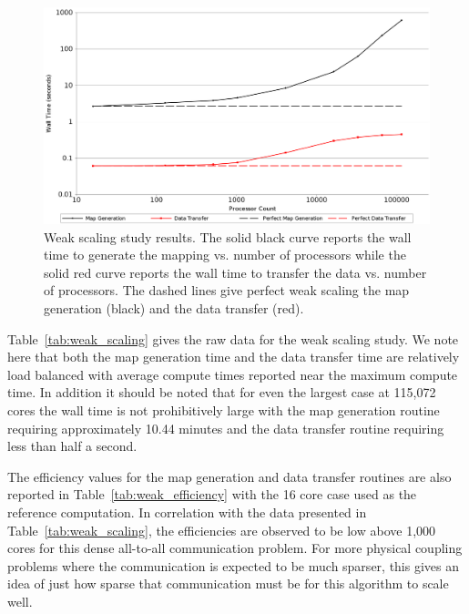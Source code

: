 \documentclass{mc2013}
\begin{document}
\begin{figure}[ht!]
  \centering \includegraphics[width=5.5in]{WeakScaling.png}
  \caption{Weak scaling study results. The solid black curve reports
    the wall time to generate the mapping vs. number of processors
    while the solid red curve reports the wall time to transfer the
    data vs. number of processors. The dashed lines give perfect weak
    scaling the map generation (black) and the data transfer (red).}
  \label{fig:weak_scaling}
\end{figure}

Table~\ref{tab:weak_scaling} gives the raw data for the weak scaling
study. We note here that both the map generation time and the data
transfer time are relatively load balanced with average compute times
reported near the maximum compute time. In addition it should be noted
that for even the largest case at 115,072 cores the wall time is not
prohibitively large with the map generation routine requiring
approximately 10.44 minutes and the data transfer routine requiring
less than half a second.

The efficiency values for the map generation and data transfer
routines are also reported in Table~\ref{tab:weak_efficiency} with the
16 core case used as the reference computation. In correlation with
the data presented in Table~\ref{tab:weak_scaling}, the efficiencies
are observed to be low above 1,000 cores for this dense all-to-all
communication problem. For more physical coupling problems where the
communication is expected to be much sparser, this gives an idea of
just how sparse that communication must be for this algorithm to scale
well.
\end{document}
